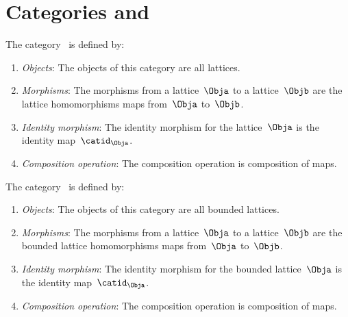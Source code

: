 \section{Categories \Lat and \BoundedLat}
\begin{ctdefinition}
    \label{def:Lat}
    The category~\iindex{\Lat} is defined by:
    \begin{enumerate}
        \item \emph{Objects}: The objects of this category are all lattices.
        \item \emph{Morphisms}: The morphisms from a lattice~$\Obja$ to a lattice~$\Objb$ are the lattice homomorphisms maps from~$\Obja$ to~$\Objb$.
        \item \emph{Identity morphism}: The identity morphism for the lattice~$\Obja$
              is the identity map~$\catid_\Obja$.
        \item \emph{Composition operation}: The composition operation is composition of maps.
    \end{enumerate}
\end{ctdefinition}

\begin{ctdefinition}
    \label{def:BoundedLat}
    The category~\iindex{\BoundedLat} is defined by:
    \begin{enumerate}
        \item \emph{Objects}: The objects of this category are all bounded lattices.
        \item \emph{Morphisms}: The morphisms from a lattice~$\Obja$ to a lattice~$\Objb$ are the bounded lattice homomorphisms maps from~$\Obja$ to~$\Objb$.
        \item \emph{Identity morphism}: The identity morphism for the bounded lattice~$\Obja$
              is the identity map~$\catid_\Obja$.
        \item \emph{Composition operation}: The composition operation is composition of maps.
    \end{enumerate}
\end{ctdefinition}

